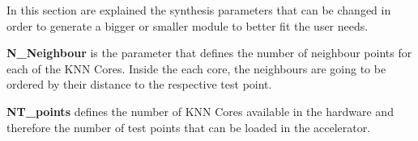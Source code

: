 In this section are explained the synthesis parameters that can be changed in
order to generate a bigger or smaller module to better fit the user needs.

\textbf{N\_Neighbour} is the parameter that defines the number of neighbour points for each of the KNN Cores. Inside the each core, the neighbours are going to be ordered by their distance to the respective test point.

\textbf{NT\_points} defines the number of KNN Cores available in the hardware and therefore the number of test points that can be loaded in the accelerator.
